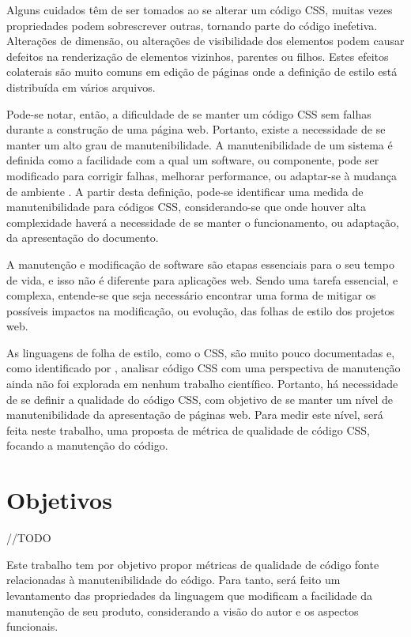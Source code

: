 Alguns cuidados têm de ser tomados ao se alterar um código CSS, muitas vezes propriedades
podem sobrescrever outras, tornando parte do código inefetiva. Alterações de dimensão,
ou alterações de visibilidade dos elementos podem causar defeitos na renderização de elementos vizinhos, parentes ou filhos. Estes efeitos colaterais são muito comuns em edição de páginas onde a definição de estilo está distribuída em vários arquivos.

Pode-se notar, então, a dificuldade de se manter um código CSS sem falhas durante a construção de uma página web. Portanto, existe a necessidade de se manter um alto grau de manutenibilidade. A manutenibilidade de um sistema é definida como a facilidade com a qual um software, ou componente, pode ser modificado para corrigir falhas, melhorar performance, ou adaptar-se à mudança de ambiente \cite{Ieee1990}. A partir desta definição, pode-se identificar uma medida de manutenibilidade para códigos CSS, considerando-se que onde houver alta complexidade haverá a necessidade de se manter o funcionamento, ou adaptação, da apresentação do documento.

A manutenção e modificação de software são etapas essenciais para o seu tempo de vida,
e isso não é diferente para aplicações web. Sendo uma tarefa essencial, e complexa, entende-se que seja necessário encontrar uma forma de mitigar os possíveis impactos na modificação, ou evolução, das folhas de estilo dos projetos web.

As linguagens de folha de estilo, como o CSS, são muito pouco documentadas \cite{Marden1999;Quint2007;Geneves2012;} e, como identificado por , analisar código CSS com uma perspectiva de manutenção ainda não foi explorada em nenhum trabalho científico. Portanto, há necessidade de se definir a qualidade do código CSS, com objetivo de se manter um nível de manutenibilidade da apresentação de páginas web. Para medir este nível, será feita neste trabalho, uma proposta de métrica de qualidade de código CSS, focando a manutenção do código.

\section{Objetivos}
//TODO

Este trabalho tem por objetivo propor métricas de qualidade de código fonte relacionadas
à manutenibilidade do código. Para tanto, será feito um levantamento das propriedades da
linguagem que modificam a facilidade da manutenção de seu produto, considerando a visão do
autor e os aspectos funcionais. 